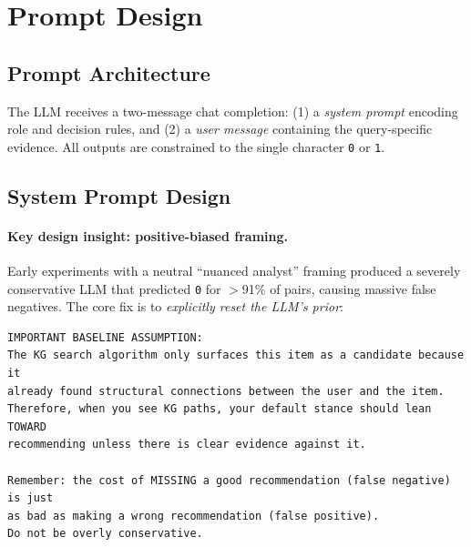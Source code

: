 \documentclass[12pt,a4paper]{article}
\begin{document}
\section{Prompt Design}
\label{sec:prompt}

\subsection{Prompt Architecture}

The LLM receives a two-message chat completion:
(1) a \emph{system prompt} encoding role and decision rules, and
(2) a \emph{user message} containing the query-specific evidence.
All outputs are constrained to the single character \texttt{0} or \texttt{1}.

\subsection{System Prompt Design}

\paragraph{Key design insight: positive-biased framing.}
Early experiments with a neutral ``nuanced analyst'' framing produced
a severely conservative LLM that predicted \texttt{0} for $>$91\% of pairs,
causing massive false negatives.
The core fix is to \emph{explicitly reset the LLM's prior}:

\begin{lstlisting}[language={}, caption={Core excerpt from the system prompt.}]
IMPORTANT BASELINE ASSUMPTION:
The KG search algorithm only surfaces this item as a candidate because it
already found structural connections between the user and the item.
Therefore, when you see KG paths, your default stance should lean TOWARD
recommending unless there is clear evidence against it.

Remember: the cost of MISSING a good recommendation (false negative) is just
as bad as making a wrong recommendation (false positive).
Do not be overly conservative.
\end{lstlisting}
\end{document}
